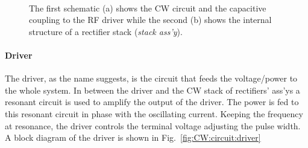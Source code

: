 \begin{refsection}
        \begin{figure}[ht]   
            \centering
            \\
            \caption{The first schematic (a) shows the CW circuit and the capacitive coupling to the RF driver while the second (b) shows the internal structure of a rectifier stack (\textit{stack ass'y}).}
        \end{figure}

        \paragraph{Driver}
        The driver, as the name suggests, is the circuit that feeds the voltage/power to the whole system.
        In between the driver and the CW stack of rectifiers' ass'ys a resonant circuit is used to amplify the output of the driver.
        The power is fed to this resonant circuit in phase with the oscillating current.
        Keeping the frequency at resonance, the driver controls the terminal voltage adjusting the pulse width.
        A block diagram of the driver is shown in Fig.~\ref{fig:CW:circuit:driver}


\end{refsection}
